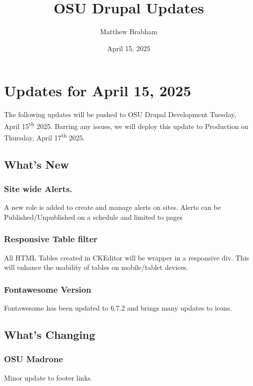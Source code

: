
\title{OSU Drupal Updates}
\author{Matthew Brabham}
\date{April 15, 2025}

    \maketitle
    \tableofcontents


    \section{Updates for April 15, 2025}
    The following updates will be pushed to OSU Drupal Development Tuesday, April 15\textsuperscript{th} 2025.
    Barring any issues, we will deploy this update to Production on Thursday, April 17\textsuperscript{th} 2025.

    \subsection{What's New}\label{subsec:what's-new}

    \subsubsection{Site wide Alerts.}
    A new role is added to create and manage alerts on sites.
    Alerts can be Published/Unpublished on a schedule and limited to pages

    \subsubsection{Responsive Table filter}
    All HTML Tables created in CKEditor will be wrapper in a responsive div.
    This will enhance the usability of tables on mobile/tablet devices.

    \subsubsection{Fontawesome Version}
    Fontawesome has been updated to 6.7.2 and brings many updates to icons.

    \subsection{What's Changing}\label{subsec:what's-chaning}

    \subsubsection{OSU Madrone}
    Minor update to footer links.

